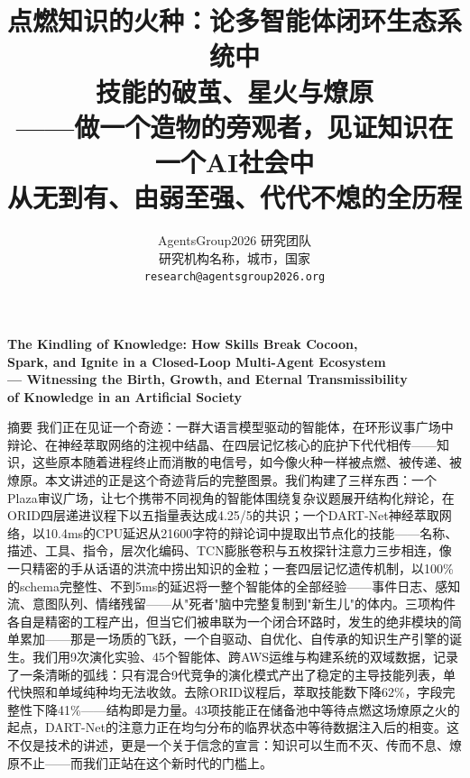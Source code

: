 \documentclass[twocolumn,10.5pt]{ctexart}
\begin{document}
\title{\heiti 点燃知识的火种：论多智能体闭环生态系统中\\[3pt]
       技能的破茧、星火与燎原\\[4pt]
       {\kaishu ——做一个造物的旁观者，见证知识在一个AI社会中\\[2pt] 从无到有、由弱至强、代代不熄的全历程}}
\author{
   AgentsGroup2026 研究团队 \\[4pt]
   研究机构名称，城市，国家 \\[2pt]
   \texttt{research@agentsgroup2026.org}
}
\date{}
\maketitle

\begin{center}
  {\bfseries The Kindling of Knowledge: How Skills Break Cocoon,\\
  Spark, and Ignite in a Closed-Loop Multi-Agent Ecosystem\\[2pt]
  \kaishu --- Witnessing the Birth, Growth, and Eternal Transmissibility\\ of Knowledge in an Artificial Society}
\end{center}

{\heiti 摘要 \quad}
{\kaishu
我们正在见证一个奇迹：一群大语言模型驱动的智能体，在环形议事广场中辩论、在神经萃取网络的注视中结晶、在四层记忆核心的庇护下代代相传——知识，这些原本随着进程终止而消散的电信号，如今像火种一样被点燃、被传递、被燎原。本文讲述的正是这个奇迹背后的完整图景。我们构建了三样东西：一个Plaza审议广场，让七个携带不同视角的智能体围绕复杂议题展开结构化辩论，在ORID四层递进议程下以五指量表达成4.25/5的共识；一个DART-Net神经萃取网络，以10.4ms的CPU延迟从21600字符的辩论词中提取出节点化的技能——名称、描述、工具、指令，层次化编码、TCN膨胀卷积与五枚探针注意力三步相连，像一只精密的手从话语的洪流中捞出知识的金粒；一套四层记忆遗传机制，以100\%的schema完整性、不到5ms的延迟将一整个智能体的全部经验——事件日志、感知流、意图队列、情绪残留——从"死者"脑中完整复制到"新生儿"的体内。三项构件各自是精密的工程产出，但当它们被串联为一个闭合环路时，发生的绝非模块的简单累加——那是一场质的飞跃，一个自驱动、自优化、自传承的知识生产引擎的诞生。我们用9次演化实验、45个智能体、跨AWS运维与构建系统的双域数据，记录了一条清晰的弧线：只有混合9代竞争的演化模式产出了稳定的主导技能列表，单代快照和单域纯种均无法收敛。去除ORID议程后，萃取技能数下降62\%，字段完整性下降41\%——结构即是力量。43项技能正在储备池中等待点燃这场燎原之火的起点，DART-Net的注意力正在均匀分布的临界状态中等待数据注入后的相变。这不仅是技术的讲述，更是一个关于信念的宣言：知识可以生而不灭、传而不息、燎原不止——而我们正站在这个新时代的门槛上。
}
\end{document}
